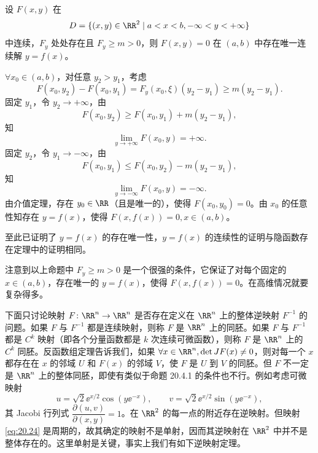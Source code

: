 \begin{xproposition}[20.4.1]
设 $F(x,y)$ 在
\[
  D=\{(x,y)\in\RR^2\mid a<x<b,-\infty<y<+\infty\}
\]
中连续，$F_y$ 处处存在且 $F_y\ge m>0$，则 $F(x,y)=0$ 在 $(a,b)$ 中存在唯一连续解 $y=f(x)$。
\end{xproposition}
\begin{xproof}
$\forall x_0\in(a,b)$，对任意 $y_2>y_1$，考虑
\[
  F(x_0,y_2)-F(x_0,y_1)=F_y(x_0,\xi)(y_2-y_1)\ge m(y_2-y_1).
\]
固定 $y_1$，令 $y_2\to+\infty$，由
\[
  F(x_0,y_2)\ge F(x_0,y_1)+m(y_2-y_1),
\]
知
\[
  \lim_{y\to+\infty}F(x_0,y)=+\infty.
\]
固定 $y_2$，令 $y_1\to-\infty$，由
\[
  F(x_0,y_1)\le F(x_0,y_2)-m(y_2-y_1),
\]
知
\[
  \lim_{y\to-\infty}F(x_0,y)=-\infty.
\]
由介值定理，存在 $y_0\in\RR$（且是唯一的），使得 $F(x_0,y_0)=0$。由 $x_0$ 的任意性知存在 $y=f(x)$，使得 $F(x,f(x))=0,x\in(a,b)$。

至此已证明了 $y=f(x)$ 的存在唯一性，$y=f(x)$ 的连续性的证明与隐函数存在定理中的证明相同。
\end{xproof}

注意到以上命题中 $F_y\ge m>0$ 是一个很强的条件，它保证了对每个固定的 $x\in(a,b)$，存在唯一的 $y=f(x)$，使得 $F(x,f(x))=0$。在高维情况就要复杂得多。

下面只讨论映射 $F\colon\RR^n\to\RR^n$ 是否存在定义在 $\RR^n$ 上的整体逆映射 $F^{-1}$ 的问题。如果 $F$ 与 $F^{-1}$ 都是连续映射，则称 $F$ 是 $\RR^n$ 上的同胚。如果 $F$ 与 $F^{-1}$ 都是 $C^k$ 映射（即各个分量函数都是 $k$ 次连续可微函数），则称 $F$ 是 $\RR^n$ 上的 $C^k$ 同胚。反函数组定理告诉我们，如果 $\forall x\in\RR^n,\det JF(x)\ne0$，则对每一个 $x$ 都存在在 $x$ 的邻域 $U$ 和 $F(x)$ 的邻域 $V$，使 $F$ 是 $U$ 到 $V$ 的同胚。但 $F$ 不一定是 $\RR^n$ 上的整体同胚，即使有类似于命题 20.4.1 的条件也不行。例如考虑可微映射
\begin{equation}
  u=\sqrt2\ee^{x/2}\cos(y\ee^{-x}),\qquad
  v=\sqrt2\ee^{x/2}\sin(y\ee^{-x}),
  \tag{20.24}
  \label{eq:20.24}
\end{equation}
其 Jacobi 行列式 $\dfrac{\partial(u,v)}{\partial(x,y)}=1$。在 $\RR^2$ 的每一点的附近存在逆映射。但映射 \eqref{eq:20.24} 是周期的，故其确定的映射不是单射，因而其逆映射在 $\RR^2$ 中并不是整体存在的。这里单射是关键，事实上我们有如下逆映射定理。

